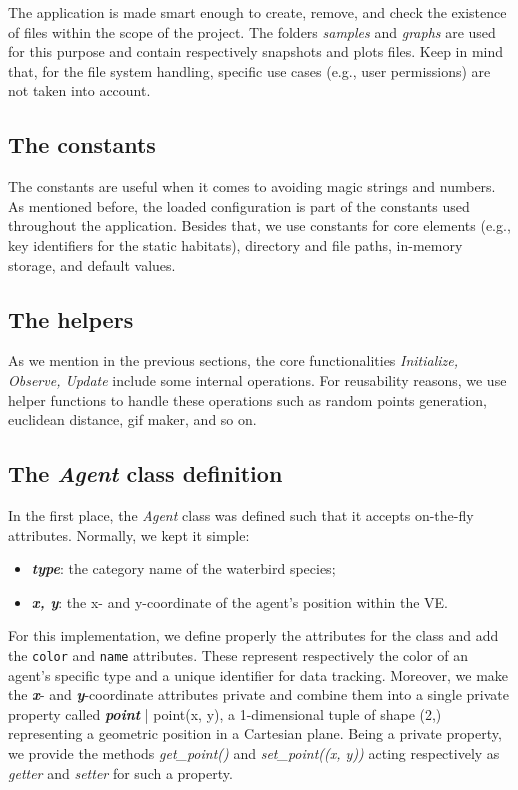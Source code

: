 
The application is made smart enough to create, remove, and check the existence of files within the scope of the project. The folders \emph{samples} and \emph{graphs} are used for this purpose and contain respectively snapshots and plots files. Keep in mind that, for the file system handling, specific use cases (e.g., user permissions) are not taken into account.

\subsection{The constants}
The constants are useful when it comes to avoiding magic strings and numbers. As mentioned before, the loaded configuration is part of the constants used throughout the application. Besides that, we use constants for core elements (e.g., key identifiers for the static habitats), directory and file paths, in-memory storage, and default values.

\subsection{The helpers}
As we mention in the previous sections, the core functionalities \emph{Initialize, Observe, Update} include some internal operations. For reusability reasons, we use helper functions to handle these operations such as random points generation, euclidean distance, gif maker, and so on.

\subsection{The \emph{Agent} class definition}
In the first place, the \emph{Agent} class was defined such that it accepts on-the-fly attributes. Normally, we kept it simple:
\begin{itemize}
    \item \textbf{\textit{type}}: the category name of the waterbird species;
    \item \textbf{\textit{x, y}}: the x- and y-coordinate of the agent's position within the VE.
\end{itemize}
For this implementation, we define properly the attributes for the class and add the \texttt{color} and \texttt{name} attributes. These represent respectively the color of an agent's specific type and a unique identifier for data tracking. Moreover, we make the \textbf{\textit{x}}- and \textbf{\textit{y}}-coordinate attributes private and combine them into a single private property called \textbf{\textit{point}} | point(x, y), a 1-dimensional tuple of shape (2,) representing a geometric position in a Cartesian plane. Being a private property, we provide the methods \emph{get\_point()} and \emph{set\_point((x, y))} acting respectively as \emph{getter} and \emph{setter} for such a property.

